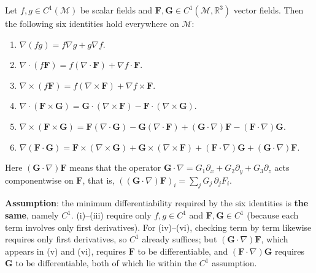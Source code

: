 \begin{theorem}\label{thm:product_rules}
Let $f, g \in C^1(\mathcal{M})$ be scalar fields and $\mathbf{F}, \mathbf{G} \in C^1(\mathcal{M}, \mathbb{R}^3)$ vector fields. Then the following six identities hold everywhere on $\mathcal{M}$:
\begin{enumerate}[label=(\roman*)]
    \item $\nabla(fg) = f\nabla g + g\nabla f$.
    \item $\nabla \cdot (f\mathbf{F}) = f(\nabla \cdot \mathbf{F}) + \nabla f \cdot \mathbf{F}$.
    \item $\nabla \times (f\mathbf{F}) = f(\nabla \times \mathbf{F}) + \nabla f \times \mathbf{F}$.
    \item $\nabla \cdot (\mathbf{F} \times \mathbf{G}) = \mathbf{G} \cdot (\nabla \times \mathbf{F}) - \mathbf{F} \cdot (\nabla \times \mathbf{G})$.
    \item $\nabla \times (\mathbf{F} \times \mathbf{G}) = \mathbf{F}(\nabla \cdot \mathbf{G}) - \mathbf{G}(\nabla \cdot \mathbf{F}) + (\mathbf{G} \cdot \nabla)\mathbf{F} - (\mathbf{F} \cdot \nabla)\mathbf{G}$.
    \item $\nabla(\mathbf{F} \cdot \mathbf{G}) = \mathbf{F} \times (\nabla \times \mathbf{G}) + \mathbf{G} \times (\nabla \times \mathbf{F}) + (\mathbf{F} \cdot \nabla)\mathbf{G} + (\mathbf{G} \cdot \nabla)\mathbf{F}$.
\end{enumerate}
Here $(\mathbf{G} \cdot \nabla)\mathbf{F}$ means that the operator $\mathbf{G} \cdot \nabla = G_1\partial_x + G_2\partial_y + G_3\partial_z$ acts componentwise on $\mathbf{F}$, that is, $((\mathbf G\cdot\nabla)\mathbf F)_i = \sum_{j}G_j\,\partial_jF_i$.

\textbf{Assumption}: the minimum differentiability required by the six identities is \textbf{the same}, namely $C^1$. (i)--(iii) require only $f,g\in C^1$ and $\mathbf F,\mathbf G\in C^1$ (because each term involves only first derivatives). For (iv)--(vi), checking term by term likewise requires only first derivatives, so $C^1$ already suffices; but $(\mathbf G\cdot\nabla)\mathbf F$, which appears in (v) and (vi), requires $\mathbf F$ to be differentiable, and $(\mathbf F\cdot\nabla)\mathbf G$ requires $\mathbf G$ to be differentiable, both of which lie within the $C^1$ assumption.
\end{theorem}

